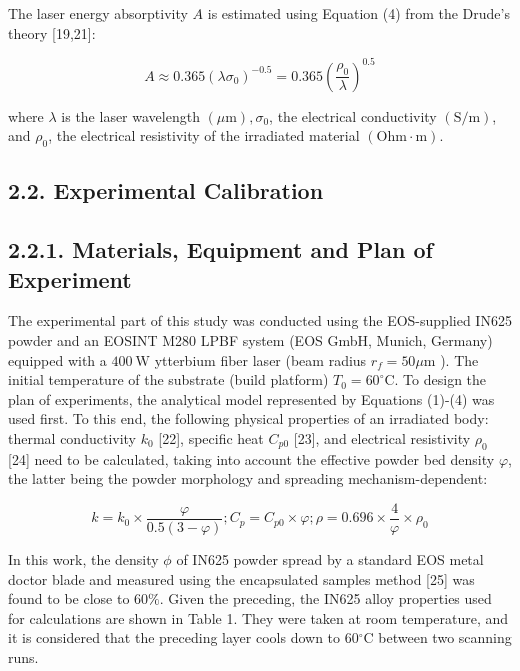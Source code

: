 \documentclass[10pt]{article}
\begin{document}
The laser energy absorptivity $A$ is estimated using Equation (4) from the Drude's theory [19,21]:


\begin{equation*}
A \approx 0.365\left(\lambda \sigma_{0}\right)^{-0.5}=0.365\left(\frac{\rho_{0}}{\lambda}\right)^{0.5} \tag{4}
\end{equation*}


where $\lambda$ is the laser wavelength $(\mu \mathrm{m}), \sigma_{0}$, the electrical conductivity $(\mathrm{S} / \mathrm{m})$, and $\rho_{0}$, the electrical resistivity of the irradiated material $(\mathrm{Ohm} \cdot \mathrm{m})$.

\subsection*{2.2. Experimental Calibration}
\subsection*{2.2.1. Materials, Equipment and Plan of Experiment}
The experimental part of this study was conducted using the EOS-supplied IN625 powder and an EOSINT M280 LPBF system (EOS GmbH, Munich, Germany) equipped with a $400 \mathrm{~W}$ ytterbium fiber laser (beam radius $r_{f}=50 \mu \mathrm{m}$ ). The initial temperature of the substrate (build platform) $T_{0}=60^{\circ} \mathrm{C}$. To design the plan of experiments, the analytical model represented by Equations (1)-(4) was used first. To this end, the following physical properties of an irradiated body: thermal conductivity $k_{0}$ [22], specific heat $C_{p 0}$ [23], and electrical resistivity $\rho_{0}$ [24] need to be calculated, taking into account the effective powder bed density $\varphi$, the latter being the powder morphology and spreading mechanism-dependent:


\begin{equation*}
k=k_{0} \times \frac{\varphi}{0.5(3-\varphi)} ; C_{p}=C_{p 0} \times \varphi ; \rho=0.696 \times \frac{4}{\varphi} \times \rho_{0} \tag{5}
\end{equation*}


In this work, the density $\phi$ of IN625 powder spread by a standard EOS metal doctor blade and measured using the encapsulated samples method [25] was found to be close to $60 \%$. Given the preceding, the IN625 alloy properties used for calculations are shown in Table 1. They were taken at room temperature, and it is considered that the preceding layer cools down to $60{ }^{\circ} \mathrm{C}$ between two scanning runs.
\end{document}
